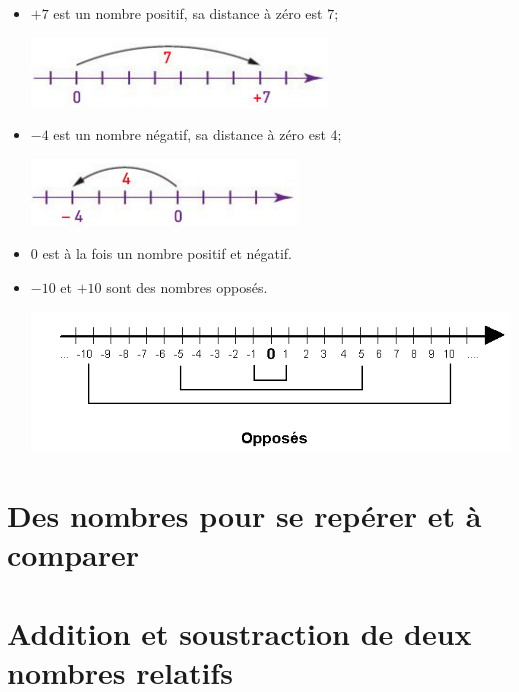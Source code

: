 \documentclass[xcolor={dvipsnames}]{beamer}
\begin{document}
\begin{frame}
	\begin{myexs}
		\begin{itemize}
			\item $+7$ est un nombre \pause positif, sa distance à zéro est \pause $7$; 
			\begin{center}
				\includegraphics[scale=0.6]{ex1}\pause
			\end{center}
			\item $\num{-4}$ est un nombre \pause négatif, sa distance à zéro est \pause $\num{4}$;
			\begin{center}
				\includegraphics[scale=0.6]{ex2}\pause
			\end{center}
			
			\item $0$ est \pause à la fois un nombre positif et négatif.%
			\item $-10$ et $+10$ sont \pause des nombres opposés.
			\begin{center}
				\includegraphics[scale=0.5]{opposes}
			\end{center}
		\end{itemize}
	\end{myexs}
\end{frame}

\section{Des nombres pour se repérer et à comparer}

%

\section{Addition et soustraction de deux nombres relatifs}
\end{document}

